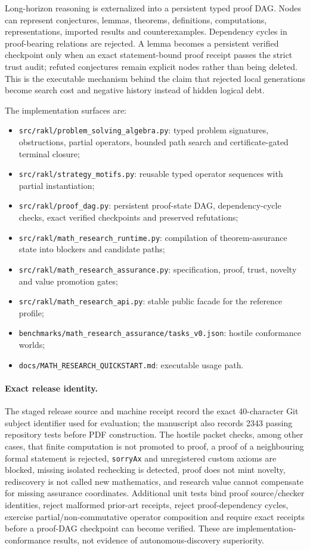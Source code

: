 \documentclass[11pt]{article}
\newcommand{\SoftwareTests}{2343}
\begin{document}
Long-horizon reasoning is externalized into a persistent typed proof DAG. Nodes can represent conjectures, lemmas, theorems, definitions, computations, representations, imported results and counterexamples. Dependency cycles in proof-bearing relations are rejected. A lemma becomes a persistent verified checkpoint only when an exact statement-bound proof receipt passes the strict trust audit; refuted conjectures remain explicit nodes rather than being deleted. This is the executable mechanism behind the claim that rejected local generations become search cost and negative history instead of hidden logical debt.

The implementation surfaces are:
\begin{itemize}[leftmargin=*]
\item \texttt{src/rakl/problem\_solving\_algebra.py}: typed problem signatures, obstructions, partial operators, bounded path search and certificate-gated terminal closure;
\item \texttt{src/rakl/strategy\_motifs.py}: reusable typed operator sequences with partial instantiation;
\item \texttt{src/rakl/proof\_dag.py}: persistent proof-state DAG, dependency-cycle checks, exact verified checkpoints and preserved refutations;
\item \texttt{src/rakl/math\_research\_runtime.py}: compilation of theorem-assurance state into blockers and candidate paths;
\item \texttt{src/rakl/math\_research\_assurance.py}: specification, proof, trust, novelty and value promotion gates;
\item \texttt{src/rakl/math\_research\_api.py}: stable public facade for the reference profile;
\item \texttt{benchmarks/math\_research\_assurance/tasks\_v0.json}: hostile conformance worlds;
\item \texttt{docs/MATH\_RESEARCH\_QUICKSTART.md}: executable usage path.
\end{itemize}

\paragraph{Exact release identity.}
The staged release source and machine receipt record the exact 40-character Git subject identifier used for evaluation; the manuscript also records \SoftwareTests{} passing repository tests before PDF construction. The hostile packet checks, among other cases, that finite computation is not promoted to proof, a proof of a neighbouring formal statement is rejected, \texttt{sorryAx} and unregistered custom axioms are blocked, missing isolated rechecking is detected, proof does not mint novelty, rediscovery is not called new mathematics, and research value cannot compensate for missing assurance coordinates. Additional unit tests bind proof source/checker identities, reject malformed prior-art receipts, reject proof-dependency cycles, exercise partial/non-commutative operator composition and require exact receipts before a proof-DAG checkpoint can become verified. These are implementation-conformance results, not evidence of autonomous-discovery superiority.
\end{document}
